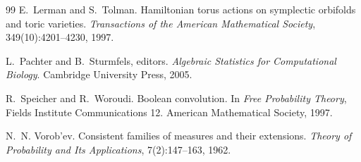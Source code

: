 \documentclass[11pt]{article}
\theoremstyle{definition}
\theoremstyle{remark}
\begin{document}
\begin{thebibliography}{99}
E.~Lerman and S.~Tolman.
\newblock Hamiltonian torus actions on symplectic orbifolds and toric varieties.
\newblock \emph{Transactions of the American Mathematical Society}, 349(10):4201--4230, 1997.

L.~Pachter and B.~Sturmfels, editors.
\newblock \emph{Algebraic Statistics for Computational Biology}.
\newblock Cambridge University Press, 2005.

R.~Speicher and R.~Woroudi.
\newblock Boolean convolution.
\newblock In \emph{Free Probability Theory}, Fields Institute Communications 12. American Mathematical
Society, 1997.

N.~N. Vorob'ev.
\newblock Consistent families of measures and their extensions.
\newblock \emph{Theory of Probability and Its Applications}, 7(2):147--163, 1962.

\end{thebibliography}
\end{document}
